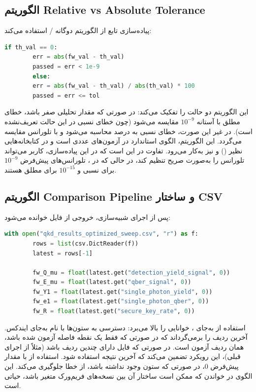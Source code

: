 \subsection{الگوریتم Relative vs Absolute Tolerance}

پیاده‌سازی تابع  از الگوریتم دوگانه / استفاده می‌کند:

\begin{LTR}
	\begin{lstlisting}[language=Python]
		if th_val == 0: 
		err = abs(fw_val - th_val)
		passed = err < 1e-9
		else:
		err = abs(fw_val - th_val) / abs(th_val) * 100
		passed = err <= tol
	\end{lstlisting}
\end{LTR}

این الگوریتم دو حالت را تفکیک می‌کند: در صورتی که مقدار تحلیلی صفر باشد، خطای مطلق با آستانه $10^{-9}$ مقایسه می‌شود (چون خطای نسبی در این حالت تعریف‌نشده است). در غیر این صورت، خطای نسبی به درصد محاسبه می‌شود و با تلورانس مقایسه می‌گردد. این الگوریتم، الگوی استاندارد در آزمون‌های عددی است و در کتابخانه‌هایی نظیر  () و  نیز به‌کار می‌رود. تفاوت در این است که در این پیاده‌سازی، کاربر می‌تواند تلورانس را به‌صورت صریح تنظیم کند، در حالی که در ، تلورانس‌های پیش‌فرض $10^{-9}$ برای نسبی و $10^{-15}$ برای مطلق هستند.

\subsection{الگوریتم Comparison Pipeline و ساختار CSV}

پس از اجرای شبیه‌سازی، خروجی از فایل  خوانده می‌شود:

\begin{LTR}
	\begin{lstlisting}[language=Python]
		with open("qkd_results_optimized_sweep.csv", "r") as f:
		rows = list(csv.DictReader(f))
		latest = rows[-1]
		
		fw_Q_mu = float(latest.get("detection_yield_signal", 0))
		fw_E_mu = float(latest.get("qber_signal", 0))
		fw_Y1 = float(latest.get("single_photon_yield", 0))
		fw_e1 = float(latest.get("single_photon_qber", 0))
		fw_R = float(latest.get("secure_key_rate", 0))
	\end{lstlisting}
\end{LTR}

استفاده از  به‌جای ، خوانایی را بالا می‌برد: دسترسی به ستون‌ها با نام به‌جای ایندکس.  آخرین ردیف را برمی‌گرداند که در صورتی که فقط یک نقطه فاصله آزمون شده باشد، همان ردیف آزمون است. در صورتی که فایل دارای چندین ردیف باشد (مثلاً از اجرای قبلی)، این رویکرد تضمین می‌کند که آخرین نتیجه استفاده شود. استفاده از  با مقدار پیش‌فرض $0$، در صورتی که ستون وجود نداشته باشد، از خطا جلوگیری می‌کند. این الگوی  در خواندن  که ممکن است ساختار آن بین نسخه‌های فریم‌ورک متغیر باشد، حیاتی است.

